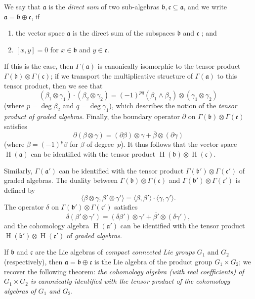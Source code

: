 \documentclass{article}
\newcommand{\fk}{\mathfrak}
\DeclareMathOperator{\HH}{H}
\newcommand{\oldpage}[1]{\marginpar{\footnotesize$\Big\vert$ \textit{p.~#1}}}
\begin{document}
We say that $\fk{a}$ is the \emph{direct sum} of two sub-algebras $\fk{b},\fk{c}\subseteq\fk{a}$, and we write $\fk{a}=\fk{b}\oplus\fk{c}$, if
\begin{enumerate}[1)]
  \item the vector space $\fk{a}$ is the direct sum of the subspaces $\fk{b}$ and $\fk{c}$ ; and
  \item $[x,y]=0$ for $x\in\fk{b}$ and $y\in\fk{c}$.
\end{enumerate}
If this is the case, then $\Gamma(\fk{a})$ is canonically isomorphic to the tensor product $\Gamma(\fk{b})\otimes\Gamma(\fk{c})$;
\oldpage{46}
if we transport the multiplicative structure of $\Gamma(\fk{a})$ to this tensor product, then we see that
\[
  (\beta_1\otimes\gamma_1)\cdot(\beta_2\otimes\gamma_2)
  = (-1)^{pq}(\beta_1\wedge\beta_2)\otimes(\gamma_1\otimes\gamma_2)
\]
(where $p=\deg\beta_2$ and $q=\deg\gamma_1$), which describes the notion of the \emph{tensor product of graded algebras}.
Finally, the boundary operator $\partial$ on $\Gamma(\fk{b})\otimes\Gamma(\fk{c})$ satisfies
\[
  \partial(\beta\otimes\gamma)
  = (\partial\beta)\otimes\gamma + \overline{\beta}\otimes(\partial\gamma)
\]
(where $\overline{\beta}=(-1)^p\beta$ for $\beta$ of degree~$p$).
It thus follows that the vector space $\HH(\fk{a})$ can be identified with the tensor product $\HH(\fk{b})\otimes\HH(\fk{c})$.

Similarly, $\Gamma(\fk{a}')$ can be identified with the tensor product $\Gamma(\fk{b}')\otimes\Gamma(\fk{c}')$ of graded algebras.
The duality between $\Gamma(\fk{b})\otimes\Gamma(\fk{c})$ and $\Gamma(\fk{b}')\otimes\Gamma(\fk{c}')$ is defined by
\[
  \langle\beta\otimes\gamma,\beta'\otimes\gamma'\rangle
  = \langle\beta,\beta'\rangle \cdot \langle\gamma,\gamma'\rangle.
\]
The operator $\delta$ on $\Gamma(\fk{b}')\otimes\Gamma(\fk{c}')$ satisfies
\[
  \delta(\beta'\otimes\gamma')
  = (\delta\beta')\otimes\gamma' + \overline{\beta'}\otimes(\delta\gamma'),
\]
and the cohomology algebra $\HH(\fk{a}')$ can be identified with the tensor product $\HH(\fk{b}')\otimes\HH(\fk{c}')$ of \emph{graded algebras}.

If $\fk{b}$ and $\fk{c}$ are the Lie algebras of \emph{compact connected Lie groups} $G_1$ and $G_2$ (respectively), then $\fk{a}=\fk{b}\oplus\fk{c}$ is the Lie algebra of the product group $G_1\times G_2$;
we recover the following theorem:
\emph{the cohomology algebra (with real coefficients) of $G_1\times G_2$ is canonically identified with the tensor product of the cohomology algebras of $G_1$ and $G_2$}.
\end{document}
